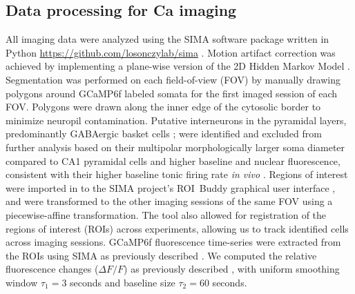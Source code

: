 \subsection{Data processing for Ca imaging}\label{sec:df:methods:processing}
All imaging data were analyzed using the SIMA software package written in Python \url{https://github.com/losonczylab/sima} \citep{Kaifosh2014}. Motion artifact correction was achieved by implementing a plane-wise version of the 2D Hidden Markov Model \citep{Dombeck2010, Kaifosh2013, Kaifosh2014}. Segmentation was performed on each field-of-view (FOV) by manually drawing polygons around GCaMP6f labeled somata for the first imaged session of each FOV. Polygons were drawn along the inner edge of the cytosolic border to minimize neuropil contamination. Putative interneurons in the pyramidal layers, predominantly GABAergic basket cells \citep{Bezaire2013, Freund1996, Klausberger2008}; were identified and excluded from further analysis based on their multipolar morphologically larger soma diameter compared to CA1 pyramidal cells \citep{Ambros-Ingerson2005, Gulyas1999a, Papp2013} and higher baseline and nuclear fluorescence, consistent with their higher baseline tonic firing rate \emph{in vivo} \citep{Klausberger2003, Klausberger2003, Lapray2012, Varga2012}. Regions of interest were imported in to the SIMA project's ROI~Buddy graphical user interface \citep{Kaifosh2014}, and were transformed to the other imaging sessions of the same FOV using a piecewise-affine transformation. The tool also allowed for registration of the regions of interest (ROIs) across experiments, allowing us to track identified cells across imaging sessions. GCaMP6f fluorescence time-series were extracted from the ROIs using SIMA as previously described \citep{Kaifosh2014}. We computed the relative fluorescence changes ($\Delta F/F$) as previously described \citep{Jia2011}, with uniform smoothing window $\tau_1 = 3$ seconds and baseline size $\tau_2 = 60$ seconds.

